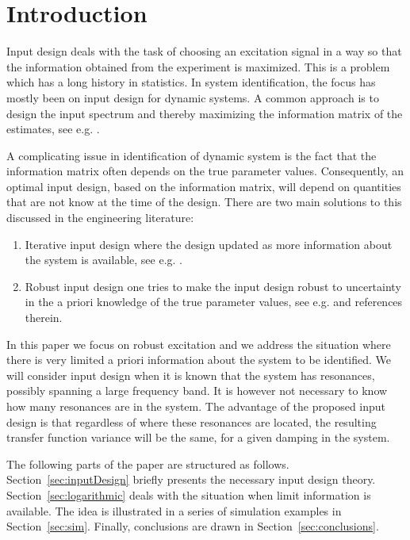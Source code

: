 \section{Introduction}\label{sec:intro}
Input design deals with the task of choosing an excitation signal in a way so that the information obtained from the experiment is maximized. This is a problem which has a long history in statistics. In system identification, the focus has mostly been on input design for dynamic systems. A common approach is to design the input spectrum and thereby maximizing the information matrix of the estimates, see e.g. \cite{Fedorov1972,Goodwin1977}.

A complicating issue in identification of dynamic system is the fact that the information matrix often depends on the true parameter values. Consequently, an optimal input design, based on the information matrix, will depend on quantities that are not know at the time of the design. There are two main solutions to this discussed in the engineering literature:
\begin{enumerate}
\item Iterative input design where the design updated as more information about the system is available, see e.g. \cite{Hjalmarsson2005,Gevers2005}.
\item Robust input design one tries to make the input design robust to uncertainty in the a priori knowledge of the true parameter values, see e.g. \cite{Rojas2007a} and references therein. 
\end{enumerate}

In this paper we focus on robust excitation and we address the situation where there is very limited a priori information about the system to be identified. We will consider input design when it is known that the system has resonances, possibly spanning a large frequency band. It is however not necessary to know how many resonances are in the system. The advantage of the proposed input design is that regardless of where these resonances are located, the resulting transfer function variance will be the same, for a given damping in the system.

The following parts of the paper are structured as follows. Section~\ref{sec:inputDesign} briefly presents the necessary input design theory. Section~\ref{sec:logarithmic} deals with the situation when limit information is available. The idea is illustrated in a series of simulation examples in Section~\ref{sec:sim}. Finally, conclusions are drawn in Section~\ref{sec:conclusions}.

